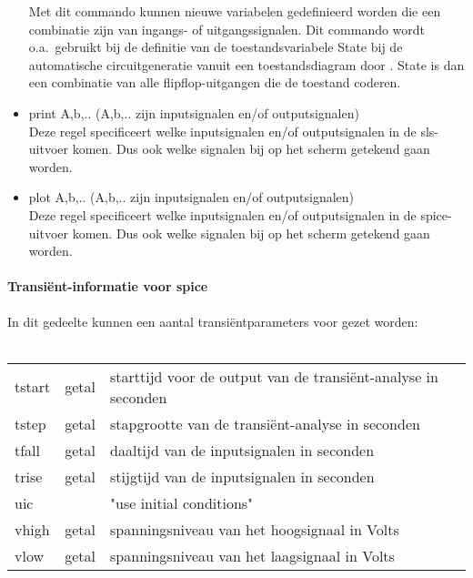 \begin{itemize}
Met dit commando kunnen nieuwe variabelen gedefinieerd worden die
een combinatie zijn van ingangs- of uitgangssignalen. Dit commando
wordt o.a.\ gebruikt bij de definitie van de toestandsvariabele State
bij de automatische circuitgeneratie vanuit een toestandsdiagram
 door . State is dan een combinatie van alle flipflop-uitgangen
die de toestand coderen.
\item
print A,b,..  (A,b,.. zijn inputsignalen en/of outputsignalen)\\
Deze regel specificeert welke inputsignalen en/of outputsignalen 
in de sls-uitvoer komen. Dus ook welke signalen bij  
op het scherm getekend gaan worden.
\item {}
plot A,b,.. (A,b,.. zijn inputsignalen en/of outputsignalen)\\
Deze regel specificeert welke inputsignalen en/of outputsignalen 
in de spice-uitvoer komen. Dus ook welke signalen bij  
op het scherm getekend gaan worden.
\end{itemize}
\paragraph{Transi\"ent-informatie voor spice}
In dit gedeelte kunnen een aantal transi\"entparameters voor  gezet worden:\\
\\
\begin{tabular}{lll}
tstart & getal & starttijd voor de output van de transi\"ent-analyse in seconden \\
tstep & getal & stapgrootte van de transi\"ent-analyse in seconden\\
tfall & getal & daaltijd van de inputsignalen in seconden\\
trise & getal & stijgtijd van de inputsignalen in seconden\\
uic && "use initial conditions"\\
vhigh & getal & spanningsniveau van het hoogsignaal in Volts\\
vlow  & getal & spanningsniveau van het laagsignaal in Volts\\
\end{tabular}

